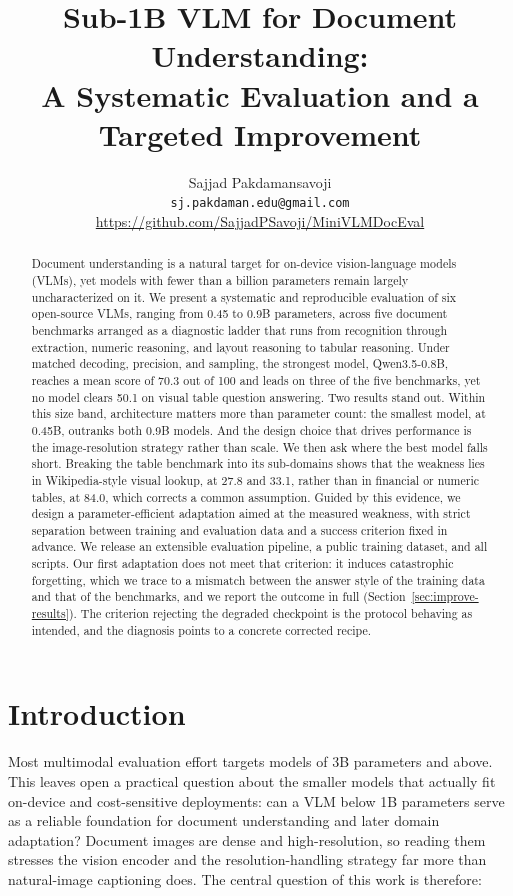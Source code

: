 \documentclass{article}
\title{Sub-1B VLM for Document Understanding:\\
A Systematic Evaluation and a Targeted Improvement}
\author{%
  Sajjad Pakdamansavoji \\
  \texttt{sj.pakdaman.edu@gmail.com} \\
  \url{https://github.com/SajjadPSavoji/MiniVLMDocEval}
}
\begin{document}
\maketitle

\begin{abstract}
Document understanding is a natural target for on-device vision-language models
(VLMs), yet models with fewer than a billion parameters remain largely
uncharacterized on it. We present a systematic and reproducible evaluation of
six open-source VLMs, ranging from 0.45 to 0.9B parameters, across five document
benchmarks arranged as a diagnostic ladder that runs from recognition through
extraction, numeric reasoning, and layout reasoning to tabular reasoning. Under
matched decoding, precision, and sampling, the strongest model, Qwen3.5-0.8B,
reaches a mean score of 70.3 out of 100 and leads on three of the five
benchmarks, yet no model clears 50.1 on visual table question answering. Two
results stand out. Within this size band, architecture matters more than
parameter count: the smallest model, at 0.45B, outranks both 0.9B models. And
the design choice that drives performance is the image-resolution strategy
rather than scale. We then ask where the best model falls short. Breaking the
table benchmark into its sub-domains shows that the weakness lies in
Wikipedia-style visual lookup, at 27.8 and 33.1, rather than in financial or
numeric tables, at 84.0, which corrects a common assumption. Guided by this
evidence, we design a parameter-efficient adaptation aimed at the measured
weakness, with strict separation between training and evaluation data and a
success criterion fixed in advance. We release an extensible evaluation
pipeline, a public training dataset, and all scripts. Our first adaptation does
not meet that criterion: it induces catastrophic forgetting, which we trace to a
mismatch between the answer style of the training data and that of the
benchmarks, and we report the outcome in full (Section~\ref{sec:improve-results}).
The criterion rejecting the degraded checkpoint is the protocol behaving as
intended, and the diagnosis points to a concrete corrected recipe.
\end{abstract}

\section{Introduction}
\label{sec:intro}

Most multimodal evaluation effort targets models of 3B parameters and above.
This leaves open a practical question about the smaller models that actually fit
on-device and cost-sensitive deployments: can a VLM below 1B parameters serve as
a reliable foundation for document understanding and later domain adaptation?
Document images are dense and high-resolution, so reading them stresses the
vision encoder and the resolution-handling strategy far more than natural-image
captioning does. The central question of this work is therefore:
\end{document}
